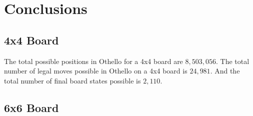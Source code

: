 \documentclass{article}
\begin{document}
\newpage

\section{Conclusions}

\subsection{4x4 Board}

The total possible positions in Othello for a 4x4 board are $8,503,056$.\cite{wiki} The total number of legal moves possible in Othello on a 4x4 board is $24,981$. And the total number of final board states possible is $2,110$.

\subsection{6x6 Board}



\newpage
\printbibliography[title={Bibliography}]
\end{document}

